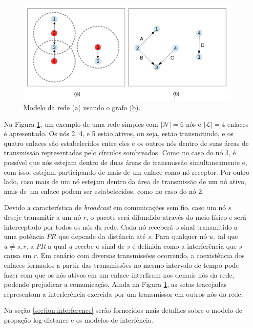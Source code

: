 \begin{figure}[htb]
\centering
\includegraphics[width=1\textwidth]{figs/grafo}
\caption[Modelo da rede (a) usando o grafo (b).]
{Modelo da rede (a) usando o grafo (b).}
\label{fig:mesh}
\end{figure}

Na Figura \ref{fig:mesh}, um exemplo de uma rede simples com $|\mathcal{N}|=6$ nós e $|\mathcal{L}|=4$ enlaces é apresentado. Os nós 2, 4, e 5 estão ativos, ou seja, estão transmitindo, e os quatro enlaces são estabelecidos entre eles e os outros nós dentro de suas áreas de transmissão representadas pelo círculos sombreados. Como no caso do nó 3, é possível que nós estejam dentro de duas áreas de transmissão simultaneamente e, com isso, estejam participando de mais de um enlace como nó receptor. Por outro lado, caso mais de um nó estejam dentro da área de transmissão de um nó ativo, mais de um enlace podem ser estabelecidos, como no caso do nó 2.

Devido a característica de {\it broadcast} em comunicações sem fio, caso um nó $s$ deseje transmitir a um nó $r$, o pacote será difundido através do meio físico e será interceptado por todos os nós da rede. Cada nó receberá o sinal transmitido a uma potência $PR$ que depende da distância até $s$. Para qualquer nó $u$, tal que $u \neq s,r$, a $PR$ a qual $u$ recebe o sinal de $s$ é definida como a interferência que $s$ causa em $r$. Em cenário com diversas transmissões ocorrendo, a coexistência dos enlaces formados a partir das transmissões no mesmo intervalo de tempo pode fazer com que os nós ativos em um enlace interfiram nos demais nós da rede, podendo prejudicar a comunicação. Ainda na Figura \ref{fig:mesh}, as setas tracejadas representam a interferência exercida por um transmissor em outros nós da rede.

Na seção \ref{section:interference} serão fornecidos mais detalhes sobre o modelo de propação log-distance e os modelos de interfência.

